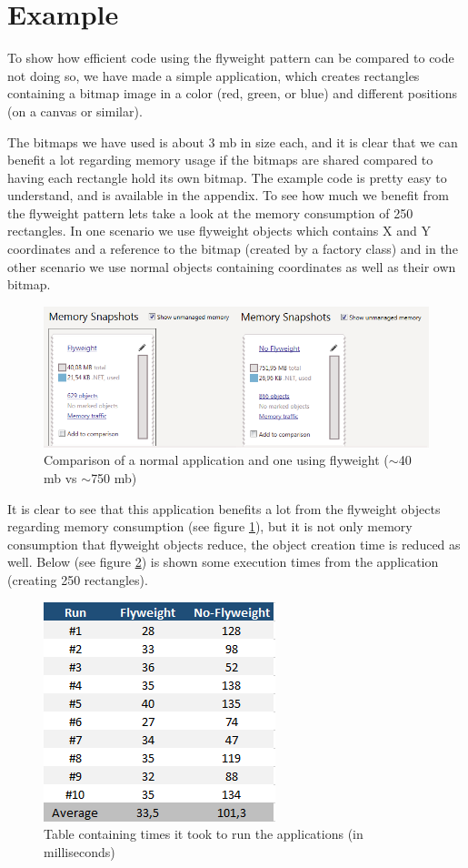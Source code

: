 \section{Example}
To show how efficient code using the flyweight pattern can be compared to code not doing so, we have made a simple application, which creates rectangles containing a bitmap image in a color (red, green, or blue) and different positions (on a canvas or similar).


The bitmaps we have used is about 3 mb in size each, and it is clear that we can benefit a lot regarding memory usage if the bitmaps are shared compared to having each rectangle hold its own bitmap.
The example code is pretty easy to understand, and is available in the appendix.
To see how much we benefit from the flyweight pattern lets take a look at the memory consumption of 250 rectangles. In one scenario we use flyweight objects which contains X and Y coordinates and a reference to the bitmap (created by a factory class) and in the other scenario we use normal objects containing coordinates as well as their own bitmap.

\begin{figure}[h]
\centering
\includegraphics[width=0.7\linewidth]{Content/Flyweight_Stats}
\caption{Comparison of a normal application and one using flyweight ($\sim$40 mb vs $\sim$750 mb)}
\label{fig:Flyweight_Stats}
\end{figure}
It is clear to see that this application benefits a lot from the flyweight objects regarding memory consumption (see figure \ref{fig:Flyweight_Stats}), but it is not only memory consumption that flyweight objects reduce, the object creation time is reduced as well. Below (see figure \ref{fig:TimeTable}) is shown some execution times from the application (creating 250 rectangles).
\begin{figure}[h]
\centering
\includegraphics{Content/TimeTable}
\caption{Table containing times it took to run the applications (in milliseconds)}
\label{fig:TimeTable}
\end{figure}
